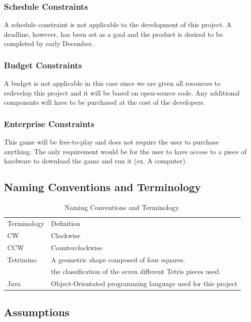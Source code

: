 \documentclass[12pt, titlepage]{article}
\begin{document}
\subsubsection{Schedule Constraints}
A schedule constraint is not applicable to the development of this project. A deadline, however, has been set as a goal and the product is desired to be completed by early December.

\subsubsection{Budget Constraints}
A budget is not applicable in this case since we are given all resources to redevelop this project and it will be based on open-source code. Any additional components will have to be purchased at the cost of the developers.
\subsubsection{Enterprise Constraints}
This game will be free-to-play and does not require the user to purchase anything. The only requirement would be for the user to have access to a piece of hardware to download the game and run it (ex. A computer).


\subsection{Naming Conventions and Terminology}

\begin{table}[!h]
	\centering
	\begin{tabular}{l|l}
	Terminology & Definition\\
	CW & Clockwise \\
	CCW & Counterclockwise\\
	Tetrimino & A geometric shape composed of four squares. \\ & the classification of the seven different Tetris pieces used.\\
	Java & Object-Orientated programming language used for this project\\
	\end{tabular}
	\caption{Naming Conventions and Terminology.}
	\label{table:term}
\end{table}


\subsection{Assumptions}
\end{document}
